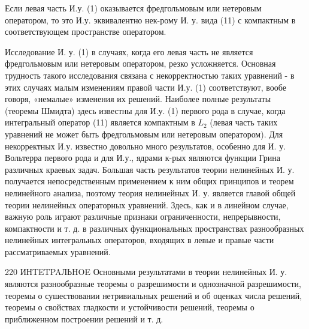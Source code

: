 \documentclass[10pt]{article}
\begin{document}
Если левая часть И.у. (1) оказывается фредгольмовым или нетеровым оператором, то это И.у. эквивалентно нек-рому И. у. вида (11) с компактным в соответствующем пространстве оператором.



Исследование И. у. (1) в случаях, когда его левая часть не является фредгольмовым или нетеровым оператором, резко усложняется. Основная трудность такого исследования связана с некорректностью таких уравнений - в этих случаях малым изменениям правой части И.у. (1) соответствуют, вообе говоря, «немалые» изменения их решений. Наиболее полные результаты (теоремы Шмидта) здесь известны для И.у. (1) первого рода в случае, когда интегральный оператор (11) является компактным в $L_{2}$ (левая часть таких уравнений не может быть фредгольмовым или нетеровым оператором). Для некорректных И.у. известно довольно много результатов, особенно для И. у. Вольтерра первого рода и для И.у., ядрами к-рых являются функции Грина различных краевых задач. Большая часть результатов теории нелинейных И. у. получается непосредственным применением к ним общих принципов и теорем нелинейного анализа, поэтому теория нелинейных И. у. является главой общей теории нелинейных операторных уравнений. Здесь, как и в линейном случае, важную роль играют различные признаки ограниченности, непрерывности, компактности и т. д. в различных функциональных пространствах разнообразных нелинейных интегральных операторов, входящих в левые и правые части рассматриваемых уравнений.



220 ИНTETPAЛЬHOE Основными результатами в теории нелинейных И. у. являются разнообразные теоремы о разрешимости и однозначной разрешимости, теоремы о сушествовании нетривиальных решений и об оценках числа решений, теоремы о свойствах гладкости и устойчивости решений, теоремы о приближенном построении решений и т. д.
\end{document}
